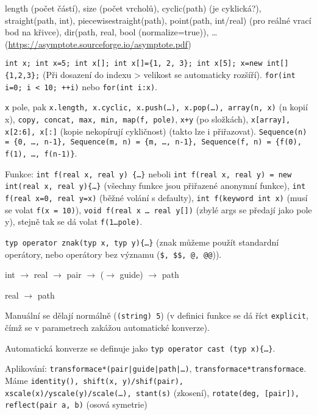 \documentclass[12pt]{article}					%
\begin{document}
    \begin{definice}
        length (počet částí), size (počet vrcholů), cyclic(path) (je cyklická?), straight(path, int), piecewisestraight(path), point(path, int/real) (pro reálné vrací bod na křivce), dir(path, real, bool (normalize=true)), … (\url{https://asymptote.sourceforge.io/asymptote.pdf})
    \end{definice}

    \begin{definice}[příkazy]
        \verb|int x; int x=5; int x[]; int x[]={1, 2, 3}; int x[5]; x=new int[]{1,2,3};| (Při dosazení do indexu > velikost se automaticky rozšíří). \verb|for(int i=0; i < 10; ++i)| nebo \verb|for(int i:x)|.

        \verb|x| pole, pak \verb|x.length, x.cyclic, x.push(…), x.pop(…), array(n, x)| (n kopií x), \verb|copy, concat, max, min, map(f, pole)|, \verb|x+y| (po složkách), \verb|x[array], x[2:6], x[:]| (kopie nekopírují cykličnost) (takto lze i přiřazovat). \verb|Sequence(n) = {0, …, n-1}, Sequence(m, n) = {m, …, n-1}, Sequence(f, n) = {f(0), f(1), …, f(n-1)}|.

        Funkce: \verb|int f(real x, real y) {…}| neboli \verb|int f(real x, real y) = new int(real x, real y){…}| (všechny funkce jsou přiřazené anonymní funkce), \verb|int f(real x=0, real y=x)| (běžné volání s defaulty), \verb|int f(keyword int x)| (musí se volat \verb|f(x = 10)|), \verb|void f(real x … real y[])| (zbylé args se předají jako pole y), stejně tak se dá volat \verb|f(1…pole)|.

        \verb|typ operator znak(typ x, typ y){…}| (znak můžeme použít standardní operátory, nebo operátory bez významu (\verb|$, $$, @, @@|)).
    \end{definice}

    \begin{definice}
        int $\rightarrow$ real $\rightarrow$ pair $\rightarrow$ ($\rightarrow$ guide) $\rightarrow$ path

        real $\rightarrow$ path

        Manuální se dělají normálně (\verb|(string) 5|) (v definici funkce se dá říct \verb|explicit|, čímž se v parametrech zakážou automatické konverze).

        Automatická konverze se definuje jako \verb|typ operator cast (typ x){…}|.
    \end{definice}

    \begin{definice}[Transformace]
        Aplikování: \verb!transformace*(pair|guide|path|…)!, \verb|transformace*transformace|. Máme \verb|identity(), shift(x, y)/shif(pair), xscale(x)/yscale(y)/scale(…), stant(s)| (zkosení), \verb|rotate(deg, [pair]), reflect(pair a, b)| (osová symetrie)
    \end{definice}
\end{document}
